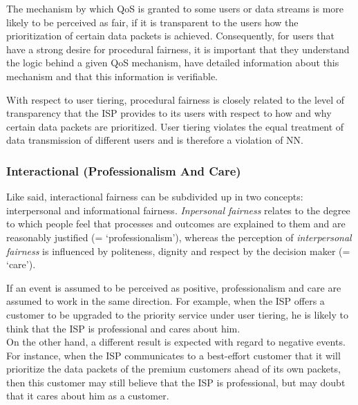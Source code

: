 The mechanism by which QoS is granted to some users or data streams is more likely to be perceived as fair, if it is transparent to the users how the prioritization of certain data packets is achieved. Consequently, for users that have a strong desire for procedural fairness, it is important that they understand the logic behind a given QoS mechanism, have detailed information about this mechanism and that this information is verifiable.

With respect to user tiering, procedural fairness is closely related to the level of transparency that the ISP provides to its users with respect to how and why certain data packets are prioritized. User tiering violates the equal treatment of data transmission of different users and is therefore a violation of NN.

\subsubsection{Interactional (Professionalism And Care)}
Like said, interactional fairness can be subdivided up in two concepts: interpersonal and informational fairness. \emph{Inpersonal fairness} relates to the degree to which people feel that processes and outcomes are explained to them and are reasonably justified (= `professionalism'), whereas the perception of \emph{interpersonal fairness} is influenced by politeness, dignity and respect by the decision maker (= `care').

If an event is assumed to be perceived as positive, professionalism and care are assumed to work in the same direction. For example, when the ISP offers a customer to be upgraded to the priority service under user tiering, he is likely to think that the ISP is professional and cares about him.\\
On the other hand, a different result is expected with regard to negative events. For instance, when the ISP communicates to a best-effort customer that it will prioritize the data packets of the premium customers ahead of its own packets, then this customer may still believe that the ISP is professional, but may doubt that it cares about him as a customer.